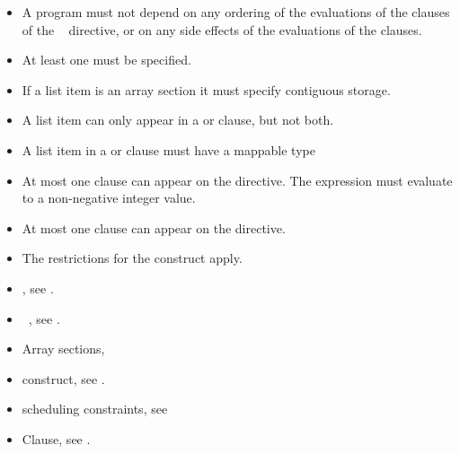 \restrictions
\begin{itemize}
\item A program must not depend on any ordering of the evaluations of the clauses of the 
~ directive, or on any side effects of the evaluations of the clauses. 

\item At least one  must be specified.

\item If a list item is an array section it must specify contiguous storage. 

\item A list item can only appear in a  or  clause, but not both.

\item A list item in a  or  clause must have a mappable type

\item At most one  clause can appear on the directive. The  expression 
must evaluate to a non-negative integer value.

\item At most one  clause can appear on the directive. 

\item The restrictions for the  construct apply. 
\end{itemize}

\crossreferences
\begin{itemize}
\item {}, see 
.

\item {}~, see 
. 

\item Array sections, 

\item {} construct, see 
.

\item {} scheduling constraints, see 

\item {} Clause, see .


\end{itemize}










